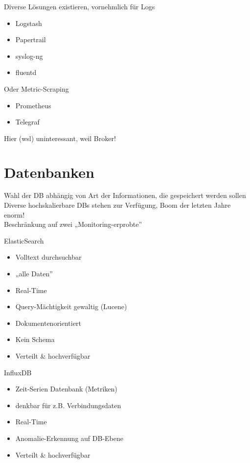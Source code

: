 \documentclass{beamer}
\begin{document}
\begin{frame}{\insertsection}
	Diverse Lösungen existieren, vornehmlich für Logs
	\begin{itemize}
		\item Logstash
		\item Papertrail
		\item syslog-ng
		\item fluentd
	\end{itemize}
	Oder Metric-Scraping
	\begin{itemize}
		\item Prometheus
		\item Telegraf
	\end{itemize}
	Hier (wsl) uninteressant, weil Broker!
\end{frame}


\section{Datenbanken}


\begin{frame}{\insertsection}
	\fontsize{20pt}{20pt}\selectfont
	Wahl der DB abhängig von Art der Informationen, die gespeichert werden sollen\\
	\vspace{2em}
	\fontsize{14pt}{14pt}\selectfont
	Diverse hochskalierbare DBs stehen zur Verfügung, Boom der letzten Jahre enorm!\\
	\vspace{1em}
	Beschränkung auf zwei „Monitoring-erprobte”
\end{frame}


\begin{frame}{ElasticSearch}
	\begin{itemize}
		\setlength\itemsep{1em}
		\item Volltext durchsuchbar
		\item „alle Daten”
		\item Real-Time
		\item Query-Mächtigkeit gewaltig (Lucene)
		\item Dokumentenorientiert
		\item Kein Schema
		\item Verteilt \& hochverfügbar
	\end{itemize}
\end{frame}

\begin{frame}{InfluxDB}
	\begin{itemize}
		\setlength\itemsep{1em}
		\item Zeit-Serien Datenbank (Metriken)
		\item denkbar für z.B. Verbindungsdaten
		\item Real-Time
		\item Anomalie-Erkennung auf DB-Ebene
		\item Verteilt \& hochverfügbar
	\end{itemize}
\end{frame}
\end{document}
